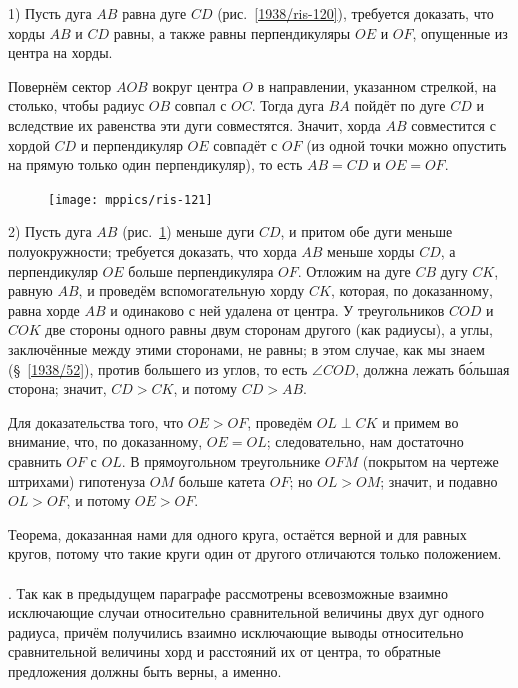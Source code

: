 \documentclass[twoside]{book}
\begin{document}
1) Пусть дуга $AB$ равна дуге $CD$ (рис.~\ref{1938/ris-120}), требуется доказать, что хорды $AB$ и $CD$ равны, а также равны перпендикуляры $OE$ и $OF$, опущенные из центра на хорды.

Повернём сектор $AOB$ вокруг центра $O$ в направлении, указанном стрелкой, на столько, чтобы радиус $OB$ совпал с $OC$.
Тогда дуга $BA$ пойдёт по дуге $CD$ и вследствие их равенства эти дуги совместятся.
Значит, хорда $AB$ совместится с хордой $CD$ и перпендикуляр $OE$ совпадёт с $OF$ (из одной точки можно опустить на прямую только один перпендикуляр), то есть
$AB=CD$ и $OE=OF$.

\begin{figure}
\centering
\texttt{[image: mppics/ris-121]}
\caption{}\label{1938/ris-121}
\end{figure}

2) Пусть дуга $AB$ (рис.~\ref{1938/ris-121}) меньше дуги $CD$, и притом обе дуги меньше полуокружности;
требуется доказать, что хорда $AB$ меньше хорды $CD$, а перпендикуляр $OE$ больше перпендикуляра $OF$.
Отложим на дуге $CB$ дугу $CK$, равную $AB$, и проведём вспомогательную хорду $CK$, которая, по доказанному, равна хорде $AB$ и одинаково с ней удалена от центра.
У треугольников $COD$ и $COK$ две стороны одного равны двум сторонам другого (как радиусы), а углы, заключённые между этими сторонами, не равны;
в этом случае, как мы знаем (§~\ref{1938/52}), против большего из углов, то есть
$\angle COD$, должна лежать б\'{о}льшая сторона;
значит, $CD>CK$, и потому $CD>AB$.

Для доказательства того, что $OE>OF$, проведём $OL\perp CK$ и примем во внимание, что, по доказанному, $OE=OL$;
следовательно, нам достаточно сравнить $OF$ с $OL$.
В прямоугольном треугольнике $OFM$ (покрытом на чертеже штрихами) гипотенуза $OM$ больше катета $OF$;
но $OL>OM$;
значит, и подавно $OL>OF$, и потому $OE>OF$.

Теорема, доказанная нами для одного круга, остаётся верной и для равных кругов, потому что такие круги один от другого отличаются только положением.

\paragraph{}\label{1938/110}
.
Так как в предыдущем параграфе рассмотрены всевозможные взаимно исключающие случаи относительно сравнительной величины двух дуг одного радиуса, причём получились взаимно исключающие выводы относительно сравнительной величины хорд и расстояний их от центра, то обратные предложения должны быть верны, а именно.
\end{document}
